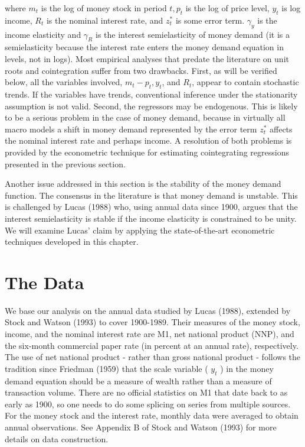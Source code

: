 \documentclass[10pt]{article}
\begin{document}
where $m_{t}$ is the log of money stock in period $t, p_{t}$ is the log of price level, $y_{t}$ is log income, $R_{t}$ is the nominal interest rate, and $z_{t}^{*}$ is some error term. $\gamma_{y}$ is the income elasticity and $\gamma_{R}$ is the interest semielasticity of money demand (it is a semielasticity because the interest rate enters the money demand equation in levels, not in logs). Most empirical analyses that predate the literature on unit roots and cointegration suffer from two drawbacks. First, as will be verified below, all the variables involved, $m_{t}-p_{t}, y_{t}$, and $R_{t}$, appear to contain stochastic trends. If the variables have trends, conventional inference under the stationarity assumption is not valid. Second, the regressors may be endogenous. This is likely to be a serious problem in the case of money demand, because in virtually all macro models a shift in money demand represented by the error term $z_{t}^{*}$ affects the nominal interest rate and perhaps income. A resolution of both problems is provided by the econometric technique for estimating cointegrating regressions presented in the previous section.

Another issue addressed in this section is the stability of the money demand function. The consensus in the literature is that money demand is unstable. This is challenged by Lucas (1988) who, using annual data since 1900, argues that the interest semielasticity is stable if the income elasticity is constrained to be unity. We will examine Lucas' claim by applying the state-of-the-art econometric techniques developed in this chapter.

\section*{The Data}
We base our analysis on the annual data studied by Lucas (1988), extended by Stock and Watson (1993) to cover 1900-1989. Their measures of the money stock, income, and the nominal interest rate are M1, net national product (NNP), and the six-month commercial paper rate (in percent at an annual rate), respectively. The use of net national product - rather than gross national product - follows the tradition since Friedman (1959) that the scale variable ( $y_{t}$ ) in the money demand equation should be a measure of wealth rather than a measure of transaction volume. There are no official statistics on M1 that date back to as early as 1900, so one needs to do some splicing on series from multiple sources. For the money stock and the interest rate, monthly data were averaged to obtain annual observations. See Appendix B of Stock and Watson (1993) for more details on data construction.
\end{document}
